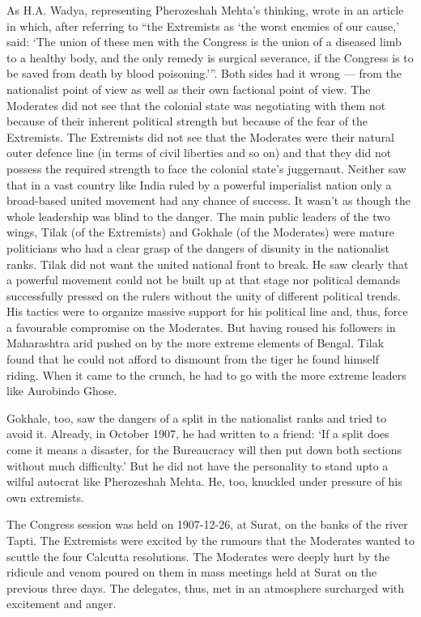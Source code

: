 \begin{multicols}{2}
As H.A. Wadya, representing Pherozeshah Mehta's thinking, wrote in an article in which, after referring to ``the Extremists as `the worst enemies of our cause,' said: `The union of these men with the Congress is the union of a diseased limb to a healthy body, and the only remedy is surgical severance, if the Congress is to be saved from death by blood poisoning.'''. Both sides had it wrong --- from the nationalist point of view as well as their own factional point of view. The Moderates did not see that the colonial state was negotiating with them not because of their inherent political strength but because of the fear of the Extremists. The Extremists did not see that the Moderates were their natural outer defence line (in terms of civil liberties and so on) and that they did not possess the required strength to face the colonial state's juggernaut. Neither saw that in a vast country like India ruled by a powerful imperialist nation only a broad-based united movement had any chance of success. It wasn't as though the whole leadership was blind to the danger. The main public leaders of the two wings, Tilak (of the Extremists) and Gokhale (of the Moderates) were mature politicians who had a clear grasp of the dangers of disunity in the nationalist ranks. Tilak did not want the united national front to break. He saw clearly that a powerful movement could not be built up at that stage nor political demands successfully pressed on the rulers without the unity of different political trends. His tactics were to organize massive support for his political line and, thus, force a favourable compromise on the Moderates. But having roused his followers in Maharashtra arid pushed on by the more extreme elements of Bengal. Tilak found that he could not afford to dismount from the tiger he found himself riding. When it came to the crunch, he had to go with the more extreme leaders like Aurobindo Ghose.

Gokhale, too, saw the dangers of a split in the nationalist ranks and tried to avoid it. Already, in October 1907, he had written to a friend: `If a split does come it means a disaster, for the Bureaucracy will then put down both sections without much difficulty.' But he did not have the personality to stand upto a wilful autocrat like Pherozeshah Mehta. He, too, knuckled under pressure of his own extremists.

The Congress session was held on 1907-12-26, at Surat, on the banks of the river Tapti. The Extremists were excited by the rumours that the Moderates wanted to scuttle the four Calcutta resolutions. The Moderates were deeply hurt by the ridicule and venom poured on them in mass meetings held at Surat on the previous three days. The delegates, thus, met in an atmosphere surcharged with excitement and anger.


\end{multicols}
